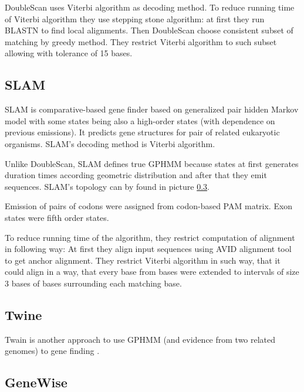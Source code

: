 DoubleScan uses Viterbi algorithm as decoding method.  To reduce running time of
Viterbi algorithm they use stepping stone algorithm: at first they run BLASTN to
find local alignments. Then DoubleScan choose consistent subset of matching by
greedy method. They restrict Viterbi algorithm to such subset allowing with
tolerance of 15 bases.

\subsection{SLAM}

SLAM is comparative-based gene finder \cite{SLAM2003} based on generalized pair
hidden Markov model \cite{Alexanderson2004} with some states being also a
high-order states (with dependence on previous emissions).  It predicts gene
structures for pair of related eukaryotic organisms. SLAM's decoding method is
Viterbi algorithm. 

Unlike DoubleScan, SLAM defines true GPHMM because states at first generates
duration times according geometric distribution and after that they emit
sequences. SLAM's topology can by found in picture \ref{}. 

Emission of pairs of codons were assigned from codon-based PAM matrix. Exon
states were fifth order states.

To reduce running time of the algorithm, they restrict computation of alignment
in following way: At first they  align input sequences using AVID alignment
tool\cite{} to get anchor alignment. They restrict Viterbi algorithm in such
way, that it could align  in a way, that every base from  bases were extended to
intervals of size $3$ bases of bases surrounding each matching base.



\subsection{Twine}

Twain is another approach to use GPHMM (and evidence from two related genomes) to gene
finding \cite{Majoros2005}. 



\subsection{GeneWise}

